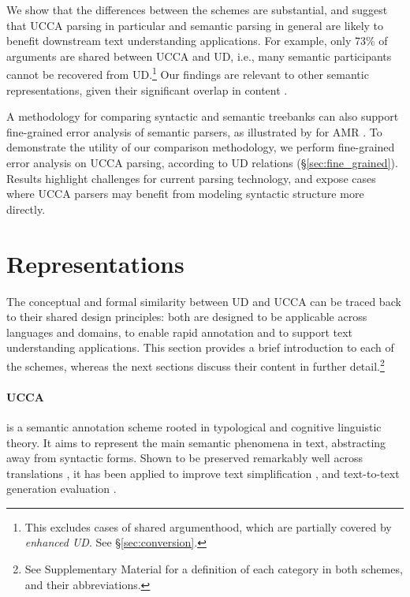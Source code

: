 \documentclass[11pt,a4paper,table]{article}
\begin{document}
  We show that the differences between the schemes are substantial, and suggest that
  UCCA parsing in particular and semantic parsing in general are likely to benefit
  downstream text understanding applications.
  For example, only 73\% of arguments are shared between UCCA and UD,
  i.e., many semantic participants cannot be recovered from UD.\footnote{This excludes cases of shared 
  argumenthood, which are partially covered by \textit{enhanced UD}. See \S\ref{sec:conversion}.}
  Our findings are relevant to other semantic representations, given their 
  significant overlap in content \cite{abend2017state}.
    
  
  A methodology for comparing syntactic and semantic treebanks can also support fine-grained error 
  analysis of semantic parsers, as illustrated by \citet{szubert2018structured} 
  for AMR \citep{banarescu2013abstract}.
  To demonstrate the utility of our comparison methodology,
  we perform fine-grained error analysis on UCCA parsing,
  according to UD relations (\S\ref{sec:fine_grained}).
  Results highlight challenges for current parsing technology,
  and expose cases where UCCA parsers may benefit from modeling syntactic structure more directly.



\section{Representations}\label{sec:representations}

  The conceptual and formal similarity between UD and UCCA can be traced back
  to their shared design principles:
  both are designed to be applicable across languages and domains, 
  to enable rapid annotation and to support text understanding
  applications. This section provides a brief introduction to each of the schemes, whereas
  the next sections discuss their content in further
  detail.\footnote{See Supplementary Material for a definition of each category in both schemes,
  and their abbreviations.}
  


\paragraph{UCCA}\label{sec:ucca}
  is a semantic annotation scheme rooted in typological 
  and cognitive linguistic theory.
  It aims to represent the main semantic phenomena in text, abstracting away from syntactic forms.
  Shown to be preserved remarkably well across translations \citep{sulem2015conceptual}, it has been applied to
  improve text simplification \citep{sulem2018simple},
  and text-to-text generation evaluation \citep{birch2016hume,choshen2018usim,sulem2018samsa}.
\end{document}
